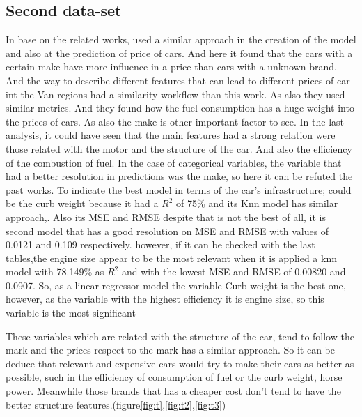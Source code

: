 \documentclass{article}
\begin{document}
\subsection{Second data-set}
In base on the related works, \citep{article_1012052} used a similar approach in the creation of the model and also at the prediction of price of cars. And here it found that the cars with a certain make have more influence in a price than cars with a unknown brand. And \citep{WOS:000927105100001} the way to describe different features that can lead to different prices of car int the Van regions had a similarity workflow than this work. As also they used similar metrics. And \citep{WEBER2019109} they found how the fuel consumption has a huge weight into the prices of cars. As also the make is other important factor to see.
In the last analysis, it could have seen that the main features had a strong relation were those related with the motor and the structure of the car. And also the efficiency of the combustion of fuel. In the case of categorical variables, the variable that had a better resolution in predictions was the make, so here it can be refuted the past works. To indicate the best model in terms of the car's infrastructure; could be the curb weight because it had a $R^2$ of 75\% and its Knn model has  similar approach,. Also its MSE and RMSE despite that is not the best of all, it is second model that has a good resolution on MSE and RMSE with values of 0.0121 and 0.109 respectively.
however, if it can be checked with the last tables,the engine size appear to be the most relevant when it is applied a knn model with 78.149\% as $R^2$ and with the lowest MSE and RMSE of 0.00820 and 0.0907.
So, as a linear regressor model the variable Curb weight is the best one, however, as the variable with the highest efficiency it is engine size, so this variable is the most significant 

These variables which are related with the structure of the car, tend to follow the mark and the prices respect to the mark has a similar approach. So it can be deduce that relevant and expensive cars would try to make their cars as better as possible, such in the efficiency of consumption of fuel or the curb weight, horse power. Meanwhile those brands that has a cheaper cost don't tend to have the better structure features.(figure\ref{fig:t},\ref{fig:t2},\ref{fig:t3})  
\end{document}
